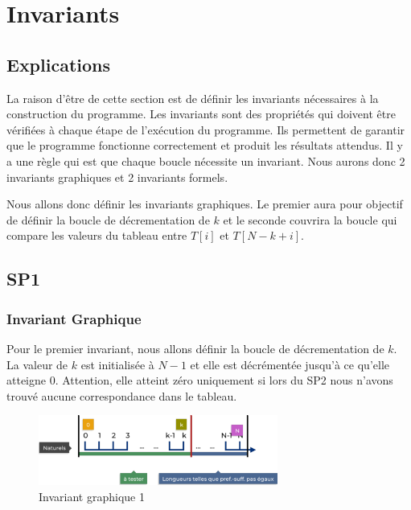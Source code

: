 \section{Invariants}\label{invariants}
\subsection{Explications}
La raison d'être de cette section est de définir les invariants nécessaires à la
construction du programme. Les invariants sont des propriétés qui doivent être
vérifiées à chaque étape de l'exécution du programme. Ils permettent de garantir
que le programme fonctionne correctement et produit les résultats attendus. Il y
a une règle qui est que chaque boucle nécessite un invariant. Nous aurons donc 2
invariants graphiques et 2 invariants formels.

Nous allons donc définir les invariants graphiques. Le premier aura pour objectif
de définir la boucle de décrementation de $k$ et le seconde couvrira la boucle
qui compare les valeurs du tableau entre $T[i]$ et $T[N-k+i]$.

\subsection{SP1}
\subsubsection{Invariant Graphique}
Pour le premier invariant, nous allons définir la boucle de décrementation de $k
$. La valeur de $k$ est initialisée à $N - 1$ et elle est décrémentée jusqu'à ce
qu'elle atteigne 0. Attention, elle atteint zéro uniquement si lors du SP2 nous 
n'avons trouvé aucune correspondance dans le tableau.
\begin{figure}[h]
   \centering
   \includegraphics[width=0.7\textwidth]{sp1.pdf}
   \caption{Invariant graphique 1}
   \label{fig:invariant1}
\end{figure}

